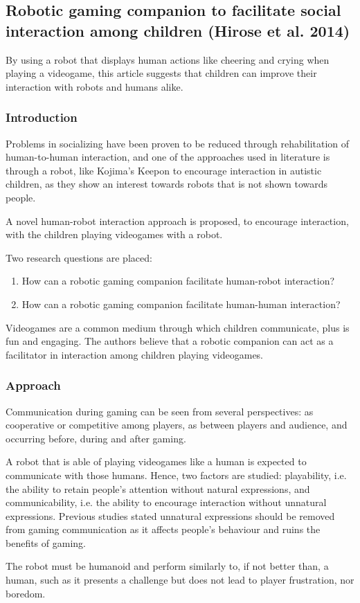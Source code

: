 \documentclass[runningheads]{llncs}
\begin{document}
\subsection{Robotic gaming companion to facilitate social interaction among children (Hirose et al. 2014)}
\par By using a robot that displays human actions like cheering and crying when playing a videogame, this article suggests that children can improve their interaction with robots and humans alike.

\subsubsection{Introduction}
\par Problems in socializing have been proven to be reduced through rehabilitation of human-to-human interaction, and one of the approaches used in literature is through a robot, like Kojima's Keepon to encourage interaction in autistic children, as they show an interest towards robots that is not shown towards people.
\par A novel human-robot interaction approach is proposed, to encourage interaction, with the children playing videogames with a robot. 
\par Two research questions are placed:
\begin{enumerate}
    \item How can a robotic gaming companion facilitate human-robot interaction?
    \item How can a robotic gaming companion facilitate human-human interaction?
\end{enumerate}
\par Videogames are a common medium through which children communicate, plus is fun and engaging. The authors believe that a robotic companion can act as a facilitator in interaction among children playing videogames.

\subsubsection{Approach}
\par Communication during gaming can be seen from several perspectives: as cooperative or competitive among players, as between players and audience, and occurring before, during and after gaming.
\par A robot that is able of playing videogames like a human is expected to communicate with those humans. Hence, two factors are studied: playability, i.e. the ability to retain people's attention without natural expressions, and communicability, i.e. the ability to encourage interaction without unnatural expressions. Previous studies stated unnatural expressions should be removed from gaming communication as it affects people's behaviour and ruins the benefits of gaming.
\par The robot must be humanoid and perform similarly to, if not better than, a human, such as it presents a challenge but does not lead to player frustration, nor boredom.
\end{document}
